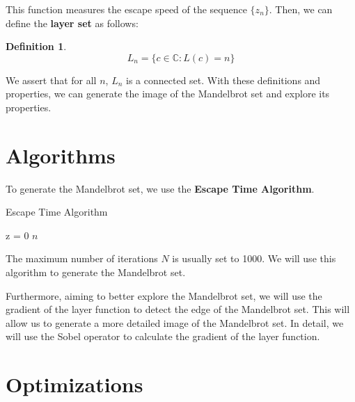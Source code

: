 \documentclass[11pt]{article}
\newtheorem{definition}{Definition}
\begin{document}
    This function measures the escape speed of the sequence $\{z_n\}$.
    Then, we can define the \textbf{layer set} as follows:

    \begin{definition}
        \begin{equation}
            L_n = \{c \in \mathbb{C} : L(c) = n \} \label{eq:layer_set}
        \end{equation}
    \end{definition}

    We assert that for all $n$, $L_n$ is a connected set.
    With these definitions and properties, we can generate the image of the Mandelbrot set and explore its properties.


    \section{Algorithms}\label{sec:algorithms}

    To generate the Mandelbrot set, we use the \textbf{Escape Time Algorithm}.

    \begin{algorithm}[H]
        \SetAlgoLined
        \caption{Escape Time Algorithm}
        \label{alg:escape_time_algorithm}
        z = 0\;
        \Return $n$\;
    \end{algorithm}

    The maximum number of iterations $N$ is usually set to 1000.
    We will use this algorithm to generate the Mandelbrot set.

    Furthermore, aiming to better explore the Mandelbrot set, we will use the gradient of the layer function to detect
    the edge of the Mandelbrot set.
    This will allow us to generate a more detailed image of the Mandelbrot set.
    In detail, we will use the Sobel operator to calculate the gradient of the layer function.


    \section{Optimizations}\label{sec:optimizations}





    
    
\end{document}
